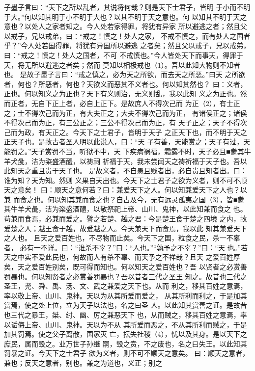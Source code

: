 \documentclass[12pt,UTF8]{ctexbook}
\begin{document}
子墨子言曰：“天下之所以乱者，其说将何哉？则是天下士君子，皆明 
于小而不明于大。”何以知其明于小不明于大也？以其不明于天之意也。何 
以知其不明于天之意也？以处人之家者知之。今人处若家得罪，将犹有异家 
所以避逃之者；然且父以戒子，兄以戒弟，曰：“戒之！慎之！处人之家， 
不戒不慎之，而有处人之国者乎？”今人处若国得罪，将犹有异国所以避逃 
之者矣；然且父以戒子，兄以戒弟，曰：“戒之！慎之！处人之国者，不可 
不戒慎也。”今人皆处天下而事天，得罪于天，将无所以避逃之者矣；然而 
莫知以相极戒也（1）。吾以此知大物则不知者也。 
是故子墨子言曰：“戒之慎之，必为天之所欲，而去天之所恶。”曰天 
之所欲者，何也？所恶者，何也？天欲义而恶其不义者也。何以知其然也？ 
曰：义者，正也。何以知义之为正也？天下有义则治，无义则乱，我以此知 
义之为正也。然而正者，无自下正上者，必自上正下。是故庶人不得次己而 
为正（2），有士正之；士不得次己而为正，有大夫正之；大夫不得次己而为正， 
有诸侯正之；诸侯不得次己而为正，有三公正之；三公不得次己而为正，有 
天子正之；天子不得次己而为政，有天正之。今天下之士君子，皆明于天子 
之正天下也，而不明于天之正天子也。是故古者圣人明以此说人，曰：“天 
子有善，天能赏之；天子有过，天能罚之。”天子赏罚不当，听狱不中，天 
下疾病祸福，霜露不时，天子必且■豢其牛羊犬彘，洁为粢盛酒醴，以祷祠 
祈福于天，我未尝闻天之祷祈福于天子也。吾以此知天之重且贵于天子也。 
是故义者，不自愚且贱者出，必自贵且知者出。曰：谁为知？天为知。然则 
义果自天出也。今天下之士君子之欲为义者，则不可不顺天之意矣！ 
曰：顺天之意何若？曰：兼爱天下之人。何以知兼爱天下之人也？以兼 
而食之也。何以知其兼而食之也？自古及今，无有远灵孤夷之国（3），皆■豢 
其牛羊犬彘，洁为粢盛酒醴，以敬祭祀上帝、山川、鬼神，以此知兼而食之 
也。苟兼而食焉，必兼而爱之。譬之若楚、越之君：今是楚王食于楚之四境 
之内，故爱楚之人；越王食于越，故爱越之人。今天兼天下而食焉，我以此 
知其兼爱天下之人也。 
且天之爱百姓也，不尽物而止矣。今天下之国，粒食之民，杀一不辜者， 
必有一不详。曰：“谁杀不辜？”曰：“人也。”“孰予之不辜？”曰：“天 
也。”若天之中实不爱此民也，何故而人有杀不辜、而天予之不祥哉？且天 
之爱百姓厚矣，天之爱百姓别矣，既可得而知也。何以知天之爱百姓也？吾 
以贤者之必赏善罚暴也。何以知贤者之必赏善罚暴也？吾以昔者三代之圣王 
知之。故昔也三代之圣王，尧、舜、禹、汤、文、武之兼爱之天下也。从而 
利之，移其百姓之意焉，率以敬上帝、山川、鬼神。天以为从其所爱而爱之， 
从其所利而利之，于是加其赏焉，使之处上位，立为天子以法也，名之曰圣 
人。以此知其赏善之证。是故昔也三代之暴王，桀、纣、幽、厉之兼恶天下 
也，从而贼之，移其百姓之意焉，率以诟侮上帝、山川、鬼神。天以为不从 
其所爱而恶之，不从其所利而贼之，于是加其罚焉。使之父子离散，国家灭 
亡，抎失社稷（4），忧以及其身。是以天下之庶民，属而毁之。业万世子孙继 
嗣，毁之贲，不之废也，名之曰失王。以此知其罚暴之证。今天下之士君子 
欲为义者，则不可不顺天之意矣。 
曰：顺天之意者，兼也；反天之意者，别也。兼之为道也，义正；别之 
\end{document}
